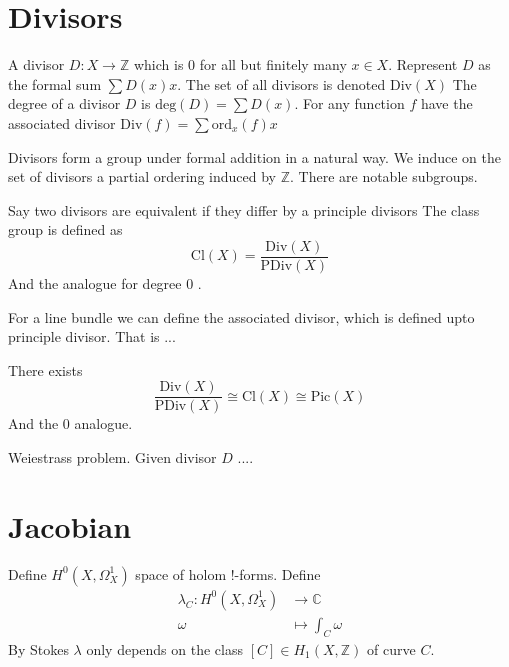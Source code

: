 
\section{Divisors} %

\begin{definition}
    A divisor $D : X \rightarrow \mathbb{Z} $ which is 0 for all but finitely many $x \in X$. 
    Represent $D$ as the formal sum $ \sum D(x) x $. 
    The set of all divisors is denoted $ \mathrm{Div}(X)$
    The degree of a divisor $D$ is $\mathrm{deg}(D)  = \sum D(x) $. 
    For any function $f$ have the associated divisor $ \mathrm{Div}(f) = \sum \mathrm{ord}_x(f) x $  
\end{definition}

Divisors form a group under formal addition in a natural way. 
We induce on the set of divisors a partial ordering induced by $\mathbb{Z} $. 
There are notable subgroups.

Say two divisors are equivalent if they differ by a principle divisors 
The class group is defined as 
\begin{equation}
    \mathrm{Cl} ( X) = \frac{\mathrm{Div }(X)}{\mathrm{PDiv}(X) }  
\end{equation}
And the analogue for degree 0 .

For a line bundle we can define the associated divisor, which is defined upto principle divisor. 
That is ...
\begin{theorem}
 There exists 
    \begin{equation}
        \frac{\mathrm{Div}(X) }{\mathrm{PDiv}(X) }  \cong \mathrm{Cl}(X) \cong \mathrm{Pic}(X) 
    \end{equation}
    And the $0 $ analogue. 
\end{theorem}

Weiestrass problem. 
Given divisor $ D$ ....

\section{Jacobian} %

Define $H^0 ( X, \Omega_X ^ 1) $ space of holom !-forms.
Define 
\begin{align}
    \lambda _ C : H^0 ( X, \Omega_X ^1 ) & \rightarrow  \mathbb{C} \\
    \omega & \mapsto \int _C \omega
\end{align}
By Stokes $\lambda$ only depends on the class $[C] \in H_1 (X, \mathbb{Z} ) $ of curve $C$. 

